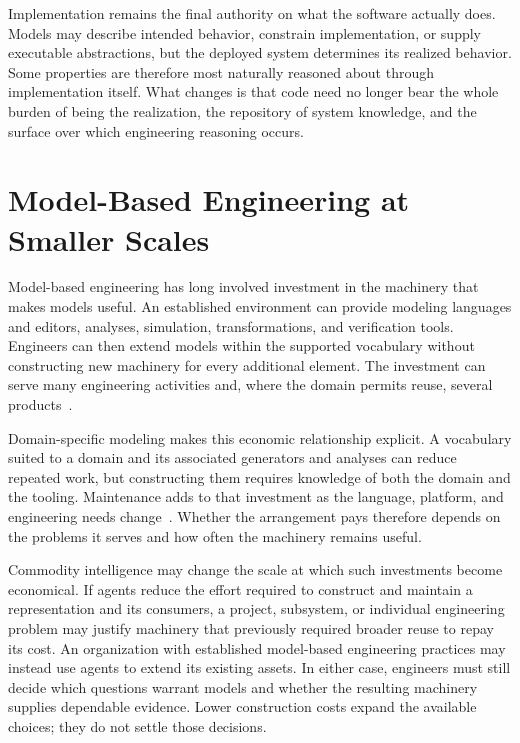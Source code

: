 
Implementation remains the final authority on what the software actually does. Models may describe intended behavior, constrain implementation, or supply executable abstractions, but the deployed system determines its realized behavior. Some properties are therefore most naturally reasoned about through implementation itself. What changes is that code need no longer bear the whole burden of being the realization, the repository of system knowledge, and the surface over which engineering reasoning occurs.

\section{Model-Based Engineering at Smaller Scales}\label{heading:model-based-engineering-at-smaller-scales}

Model-based engineering has long involved investment in the machinery that makes models useful. An established environment can provide modeling languages and editors, analyses, simulation, transformations, and verification tools. Engineers can then extend models within the supported vocabulary without constructing new machinery for every additional element. The investment can serve many engineering activities and, where the domain permits reuse, several products~\citep{schmidt2006model,kelly2008domain}.

Domain-specific modeling makes this economic relationship explicit. A vocabulary suited to a domain and its associated generators and analyses can reduce repeated work, but constructing them requires knowledge of both the domain and the tooling. Maintenance adds to that investment as the language, platform, and engineering needs change~\citep{kelly2008domain,kautz2018mbse}. Whether the arrangement pays therefore depends on the problems it serves and how often the machinery remains useful.

Commodity intelligence may change the scale at which such investments become economical. If agents reduce the effort required to construct and maintain a representation and its consumers, a project, subsystem, or individual engineering problem may justify machinery that previously required broader reuse to repay its cost. An organization with established model-based engineering practices may instead use agents to extend its existing assets. In either case, engineers must still decide which questions warrant models and whether the resulting machinery supplies dependable evidence. Lower construction costs expand the available choices; they do not settle those decisions.

